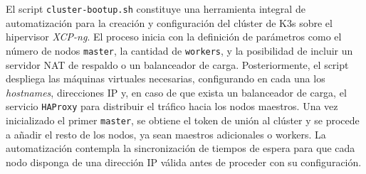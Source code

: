 El script \texttt{cluster-bootup.sh} constituye una herramienta integral de automatización para la creación y configuración del clúster de K3s sobre el hipervisor \textit{XCP-ng}. El proceso inicia con la definición de parámetros como el número de nodos \texttt{master}, la cantidad de \texttt{workers}, y la posibilidad de incluir un servidor NAT de respaldo o un balanceador de carga. Posteriormente, el script despliega las máquinas virtuales necesarias, configurando en cada una los \textit{hostnames}, direcciones IP y, en caso de que exista un balanceador de carga, el servicio \texttt{HAProxy} para distribuir el tráfico hacia los nodos maestros.  
Una vez inicializado el primer \texttt{master}, se obtiene el token de unión al clúster y se procede a añadir el resto de los nodos, ya sean maestros adicionales o workers. La automatización contempla la sincronización de tiempos de espera para que cada nodo disponga de una dirección IP válida antes de proceder con su configuración.
